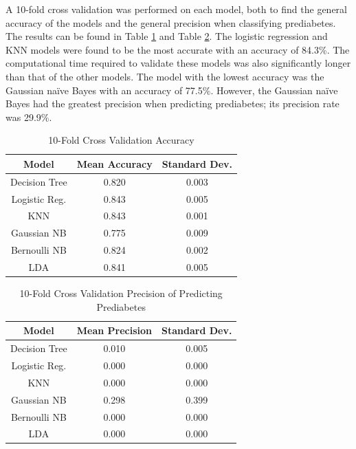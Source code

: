 \documentclass[journal]{IEEEtran}
\begin{document}
A 10-fold cross validation was performed on each model, both to find the general accuracy of the models and the general precision when classifying prediabetes. The results can be found in Table \ref{table:cross-val} and Table \ref{table:prec-cross-val}. The logistic regression and KNN models were found to be the most accurate with an accuracy of 84.3\%. The computational time required to validate these models was also significantly longer than that of the other models. The model with the lowest accuracy was the Gaussian naïve Bayes with an accuracy of 77.5\%. However, the Gaussian naïve Bayes had the greatest precision when predicting prediabetes; its precision rate was 29.9\%. 

\begin{table}[h!]
    \centering
    \begin{tabular}{c | c c }
        Model & Mean Accuracy & Standard Dev. \\
        \hline
        Decision Tree &	0.820 &	0.003 \\
        Logistic Reg. &	0.843 &	0.005 \\
        KNN &	0.843 &	0.001 \\
        Gaussian NB &	0.775 &	0.009 \\
        Bernoulli NB &	0.824 &	0.002 \\
        LDA &	0.841 &	0.005 \\
    \end{tabular}
    \caption{10-Fold Cross Validation Accuracy}
    \label{table:cross-val}
\end{table}

\begin{table}[h!]
    \centering
    \begin{tabular}{c | c c }
        Model & Mean Precision & Standard Dev. \\
        \hline
        Decision Tree &	0.010 &	0.005 \\
        Logistic Reg. & 	0.000 &	0.000 \\
        KNN & 	0.000 &	0.000 \\
        Gaussian NB & 	0.298 &	0.399 \\
        Bernoulli NB & 	0.000 &	0.000 \\
        LDA	 & 0.000 &	0.000 \\
    \end{tabular}
    \caption{10-Fold Cross Validation Precision of Predicting Prediabetes}
    \label{table:prec-cross-val}
\end{table}
\end{document}

